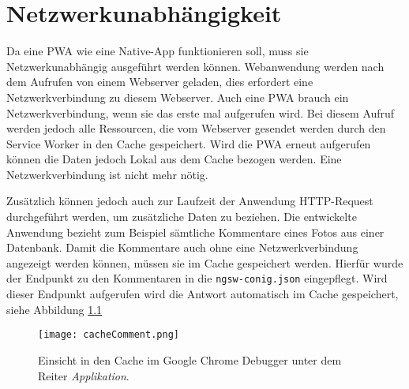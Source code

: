 \chapter{Netzwerkunabhängigkeit}

Da eine PWA wie eine Native-App funktionieren soll, muss sie Netzwerkunabhängig ausgeführt werden können. Webanwendung werden nach dem Aufrufen von einem Webserver geladen, dies erfordert eine Netzwerkverbindung zu diesem Webserver. Auch eine PWA brauch ein Netzwerkverbindung, wenn sie das erste mal aufgerufen wird. Bei diesem Aufruf werden jedoch alle Ressourcen, die vom Webserver gesendet werden durch den Service Worker in den Cache gespeichert. 
Wird die PWA erneut aufgerufen können die Daten jedoch Lokal aus dem Cache bezogen werden. Eine Netzwerkverbindung ist nicht mehr nötig. 

Zusätzlich können jedoch auch zur Laufzeit der Anwendung HTTP-Request durchgeführt werden, um zusätzliche Daten zu beziehen. Die entwickelte Anwendung bezieht zum Beispiel sämtliche Kommentare eines Fotos aus einer Datenbank. 
Damit die Kommentare auch ohne eine Netzwerkverbindung angezeigt werden können, müssen sie im Cache gespeichert werden. Hierfür wurde der Endpunkt zu den Kommentaren in die \texttt{ngsw-conig.json} eingepflegt. 
Wird dieser Endpunkt aufgerufen wird die Antwort automatisch im Cache gespeichert, siehe Abbildung \ref{img:cacheComment}

\begin{figure}[!htb]
    \centering
    \texttt{[image: cacheComment.png]}
    \caption{Einsicht in den Cache im Google Chrome Debugger unter dem Reiter \textit{Applikation}.}
    \label{img:cacheComment}
\end{figure}